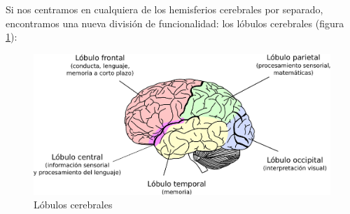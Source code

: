Si nos centramos en cualquiera de los hemisferios cerebrales por separado, encontramos una nueva división de funcionalidad: los lóbulos cerebrales (figura \ref{lobulos}):

\begin{figure}[h]
  \begin{center}
    \includegraphics[width=14cm]{images/brain.eps}
    \caption{Lóbulos cerebrales}
    \label{lobulos}
  \end{center}
\end{figure}



